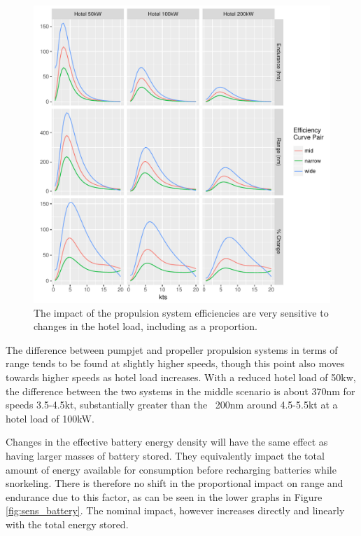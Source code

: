 \documentclass{article}\usepackage[]{graphicx}\usepackage[]{color}
\makeatletter
\def\maxwidth{ %
  \ifdim\Gin@nat@width>\linewidth
    \linewidth
  \else
    \Gin@nat@width
  \fi
}
\newenvironment{knitrout}{}{} %
\makeatother
\begin{document}
\begin{figure}
\begin{knitrout}
\color{fgcolor}

{\centering \includegraphics[width=\maxwidth]{figures/plots-plot_sens_hotel-1} 

}



\end{knitrout}
\caption{The impact of the propulsion system efficiencies are very sensitive to changes in the hotel load, including as a proportion.}
\label{fig:sens_hotel}
\end{figure}

The difference between pumpjet and propeller propulsion systems in terms of range tends to be found at slightly higher speeds, though this point also moves towards higher speeds as hotel load increases.  With a reduced hotel load of 50kw, the difference between the two systems in the middle scenario is about 370nm for speeds 3.5-4.5kt, substantially greater than the ~200nm around 4.5-5.5kt at a hotel load of 100kW.


Changes in the effective battery energy density will have the same effect as having larger masses of battery stored.  They equivalently impact the total amount of energy available for consumption before recharging batteries while snorkeling. There is therefore no shift in the proportional impact on range and endurance due to this factor, as can be seen in the lower graphs in Figure \ref{fig:sens_battery}.  The nominal impact, however increases directly and linearly with the total energy stored.
\end{document}
